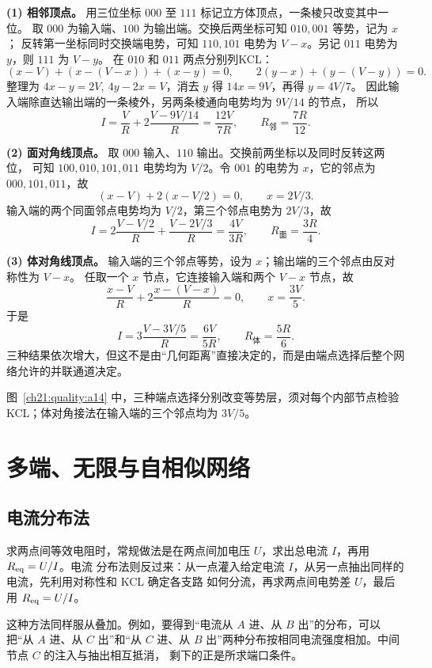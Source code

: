 {\begin{xesolution}
\textbf{(1) 相邻顶点。} 用三位坐标 $000$ 至 $111$ 标记立方体顶点，一条棱只改变其中一位。
取 $000$ 为输入端、$100$ 为输出端。交换后两坐标可知 $010,001$ 等势，记为 $x$；
反转第一坐标同时交换端电势，可知 $110,101$ 电势为 $V-x$。另记 $011$ 电势为 $y$，则 $111$ 为 $V-y$。
在 $010$ 和 $011$ 两点分别列KCL：
\[
 (x-V)+(x-(V-x))+(x-y)=0,\qquad
 2(y-x)+(y-(V-y))=0.
\]
整理为 $4x-y=2V,\ 4y-2x=V$，消去 $y$ 得 $14x=9V$，再得 $y=4V/7$。
因此输入端除直达输出端的一条棱外，另两条棱通向电势均为 $9V/14$ 的节点，
所以
\[
  I=\frac VR+2\frac{V-9V/14}{R}=\frac{12V}{7R},
  \qquad
  \boxed{R_{\text{邻}}=\frac{7R}{12}}.
\]

\textbf{(2) 面对角线顶点。} 取 $000$ 输入、$110$ 输出。交换前两坐标以及同时反转这两位，
可知 $100,010,101,011$ 电势均为 $V/2$。令 $001$ 的电势为 $x$，它的邻点为 $000,101,011$，故
\[
 (x-V)+2(x-V/2)=0,\qquad x=2V/3.
\]
输入端的两个同面邻点电势均为 $V/2$，第三个邻点电势为 $2V/3$，故
\[
  I=2\frac{V-V/2}{R}+\frac{V-2V/3}{R}=\frac{4V}{3R},
  \qquad
  \boxed{R_{\text{面}}=\frac{3R}{4}}.
\]

\textbf{(3) 体对角线顶点。} 输入端的三个邻点等势，设为 $x$；输出端的三个邻点由反对称性为 $V-x$。
任取一个 $x$ 节点，它连接输入端和两个 $V-x$ 节点，故
\[
  \frac{x-V}{R}+2\frac{x-(V-x)}R=0,
  \qquad x=\frac{3V}{5}.
\]
于是
\[
  I=3\frac{V-3V/5}{R}=\frac{6V}{5R},
  \qquad
  \boxed{R_{\text{体}}=\frac{5R}{6}}.
\]
三种结果依次增大，但这不是由“几何距离”直接决定的，而是由端点选择后整个网络允许的并联通道决定。

图~\ref{ch21:quality:a14} 中，三种端点选择分别改变等势层，须对每个内部节点检验KCL；体对角接法在输入端的三个邻点均为 $3V/5$。
\end{xesolution}



\section{多端、无限与自相似网络}

\subsection{电流分布法}


求两点间等效电阻时，常规做法是在两点间加电压 $U$，求出总电流 $I$，再用 $R_{\rm eq}=U/I$。电流
分布法则反过来：从一点灌入给定电流 $I$，从另一点抽出同样的电流，先利用对称性和 KCL 确定各支路
如何分流，再求两点间电势差 $U$，最后用 $R_{\rm eq}=U/I$。

这种方法同样服从叠加。例如，要得到“电流从 $A$ 进、从 $B$ 出”的分布，可以把“从 $A$ 进、从
$C$ 出”和“从 $C$ 进、从 $B$ 出”两种分布按相同电流强度相加。中间节点 $C$ 的注入与抽出相互抵消，
剩下的正是所求端口条件。


}
